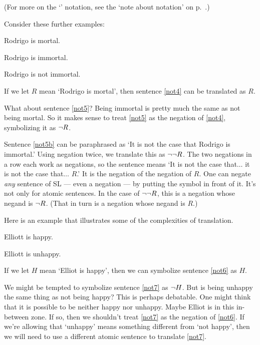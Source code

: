 
(For more on the `\metaA{}' notation, see the `note about notation' on p.\ \pageref{notationnote}.)

Consider these further examples:
\begin{earg}
\item[\ex{not4}] Rodrigo is mortal.
\item[\ex{not5}] Rodrigo is immortal.
\item[\ex{not5b}] Rodrigo is not immortal.
\end{earg}

If we let $R$ mean `Rodrigo is mortal', then sentence \ref{not4} can be translated as $R$.

What about sentence \ref{not5}? Being immortal is pretty much the same as not being mortal. So it makes sense to treat \ref{not5} as the negation of \ref{not4}, symbolizing it as $\neg{R}$.

Sentence \ref{not5b} can be paraphrased as `It is not the case that Rodrigo is immortal.' Using negation twice, we translate this as $\neg\neg R$. The two negations in a row each work as negations, so the sentence means `It is not the case that$\ldots$ it is not the case that$\ldots$ $R$.' It is the negation of the negation of $R$. One can negate \emph{any} sentence of SL --- even a negation --- by putting the \enot symbol in front of it. It's not only for atomic sentences. In the case of $\neg\neg R$, this is a negation whose negand is $\neg R$. (That in turn is a negation whose negand is $R$.)

Here is an example that illustrates some of the complexities of translation.
\begin{earg}
\item[\ex{not6}] Elliott is happy.
\item[\ex{not7}] Elliott is unhappy.
\end{earg}

If we let $H$ mean `Elliot is happy', then we can symbolize sentence \ref{not6} as $H$.

We might be tempted to symbolize sentence \ref{not7} as $\neg{H}$. But is being unhappy the same thing as not being happy? This is perhaps debatable. One might think that it is possible to be neither happy nor unhappy. Maybe Elliot is in this in-between zone. If so, then we shouldn't treat \ref{not7} as the negation of \ref{not6}. If we're allowing that `unhappy' means something different from `not happy', then we will need to use a different atomic sentence to translate \ref{not7}.

